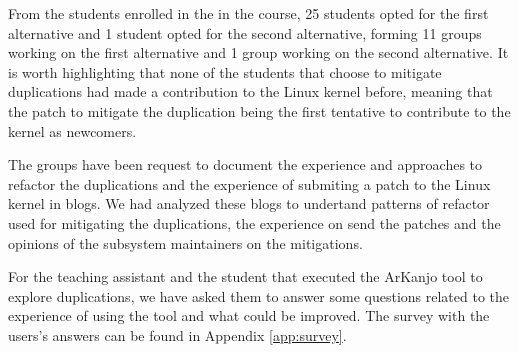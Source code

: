From the students enrolled in the in the course, 25 students opted for the first alternative and 1 student
opted for the second alternative, forming 11 groups working on the first alternative and 1 group 
working on the second alternative. It is worth highlighting that none of the students
that choose to mitigate duplications had made a contribution to the Linux kernel before,
meaning that the patch to mitigate the duplication being the first tentative to contribute to the kernel as
newcomers.

The groups have been request to document the experience and approaches to refactor the duplications and the
experience of submiting a patch to the Linux kernel in blogs. We had analyzed these blogs to undertand 
patterns of refactor used for mitigating the duplications, the experience on send the patches and the 
opinions of the subsystem maintainers on the mitigations. 

For the teaching assistant and the student that executed the ArKanjo tool to explore duplications, 
we have asked them to answer some questions related to the experience of using the tool and what could be
improved. The survey with the users's answers can be found in Appendix \ref{app:survey}.


